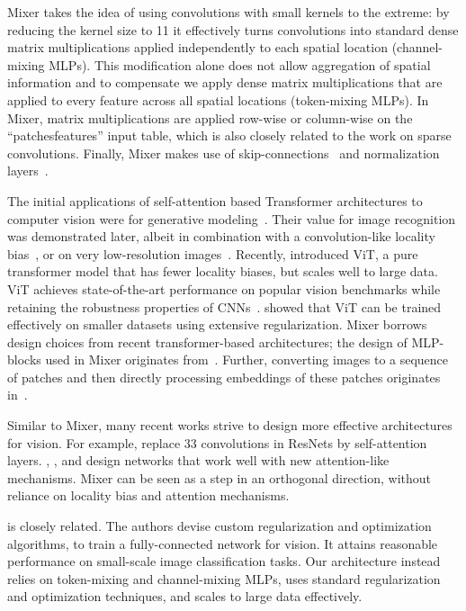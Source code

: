 \documentclass{article}
\newcommand{\name}{Mixer}
\begin{document}
\name{} takes the idea of using convolutions with small kernels to the extreme: by reducing the kernel size to 11 it effectively turns convolutions into standard dense matrix multiplications applied independently to each spatial location (channel-mixing MLPs).
This modification alone does not allow aggregation of spatial information and to compensate we apply dense matrix multiplications that are applied to every feature across all spatial locations (token-mixing MLPs). 
In \name{}, matrix multiplications are applied row-wise or column-wise on the ``patchesfeatures'' input table, which is also closely related to the work on sparse convolutions. Finally, \name{} makes use of skip-connections~\cite{he2016deep} and normalization layers~\cite{ba2016layer,ioffe2015batch}.

The initial applications of self-attention based Transformer architectures to computer vision were for generative modeling~\cite{child2019-sparsetransformers,parmar18-imagetransformer}.
Their value for image recognition was demonstrated later, albeit in combination with a convolution-like locality bias~\cite{ramachandran19-sasa}, or on very low-resolution images~\cite{cordonnier2020-sacnn}.
Recently, \citet{Dosovitskiy2021} introduced ViT, a pure transformer model that has fewer locality biases, but scales well to large data. 
ViT achieves state-of-the-art performance on popular vision benchmarks while retaining the robustness properties of CNNs~\cite{bhojanapalli2021understanding}. 
\citet{deit} showed that ViT can be trained effectively on smaller datasets using extensive regularization.
\name{} borrows design choices from recent transformer-based architectures; the design of MLP-blocks used in \name{} originates from~\citet{vaswani2017}.
Further, converting images to a sequence of patches and then directly processing embeddings of these patches originates in~\citet{Dosovitskiy2021}.

Similar to \name{}, many recent works strive to design more effective architectures for vision. 
For example, \citet{srinivas2021bottleneck} replace 33 convolutions in ResNets by self-attention layers.
\citet{ramachandran19-sasa}, \citet{li2021involution}, and \citet{bello2021lambdanetworks} design networks that work well with new attention-like mechanisms. 
\name{} can be seen as a step in an orthogonal direction, without reliance on locality bias and attention mechanisms.

\citet{neyshabur2020towards} is closely related.
The authors devise custom regularization and optimization algorithms, to train a fully-connected network for vision. It attains reasonable performance on small-scale image classification tasks. Our architecture instead relies on token-mixing and channel-mixing MLPs, uses standard regularization and optimization techniques, and scales to large data effectively. 
\end{document}
